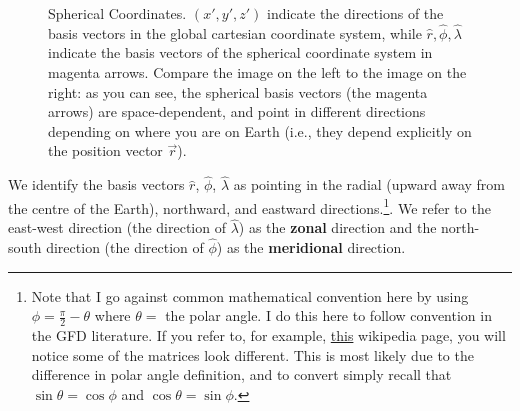 \begin{figure}[H]
{    %
    }
    \caption{Spherical Coordinates. \((x',y',z')\) indicate the directions of the basis vectors in the global cartesian coordinate system, while \(\hat{r},\hat{\phi},\hat{\lambda}\) indicate the basis vectors of the spherical coordinate system in magenta arrows. Compare the image on the left to the image on the right: as you can see, the spherical basis vectors (the magenta arrows) are space-dependent, and point in different directions depending on where you are on Earth (i.e., they depend explicitly on the position vector \(\vec{r}\)).}
    \label{LocCartes}
\end{figure}

We identify the basis vectors \(\hat{r}\), \(\hat{\phi}\), \(\hat{\lambda}\) as pointing in the radial (upward away from the centre of the Earth), northward, and eastward directions.\footnote{
    Note that I go against common mathematical convention here by using \(\phi=\frac{\pi}{2}-\theta\) where \(\theta=\) the polar angle. I do this here to follow convention in the GFD literature. If you refer to, for example, \href{https://en.wikipedia.org/wiki/Vector_fields_in_cylindrical_and_spherical_coordinates}{this}  wikipedia page, you will notice some of the matrices look different. This is most likely due to the difference in polar angle definition, and to convert simply recall that \(\sin\theta = \cos\phi\) and \(\cos\theta = \sin\phi\).
}. We refer to the east-west direction (the direction of \(\hat{\lambda}\)) as the \textbf{zonal} direction and the north-south direction (the direction of \(\hat{\phi}\)) as the \textbf{meridional} direction.

